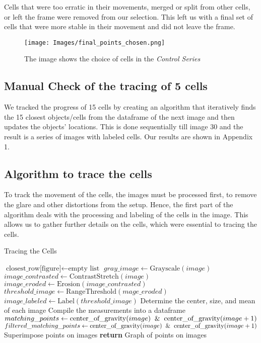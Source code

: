 \documentclass{article}
\begin{document}
Cells that were too erratic in their movements, merged or split from other cells, or left the frame were removed from our selection. This left us with a final set of cells that were more stable in their movement and did not leave the frame.

\begin{figure}[h!]
\centering
\texttt{[image: Images/final\_points\_chosen.png]}
\caption{\label{fig:ChoiceofCells-ControlSeries}The image shows the choice of cells in the \emph{Control Series}}
\end{figure}


\subsection*{Manual Check of the tracing of 5 cells}

We tracked the progress of 15 cells by creating an algorithm that iteratively finds the 15 closest objects/cells from the dataframe of the next image and then updates the objects' locations. This is done sequentially till image 30 and the result is a series of images with labeled cells. Our results are shown in Appendix 1. 

\subsection*{Algorithm to trace the cells}
To track the movement of the cells, the images must be processed first, to remove the glare and other distortions from the setup. Hence, the first part of the algorithm deals with the processing and labeling of the cells in the image. This allows us to gather further details on the cells, which were essential to tracing the cells. 

\begin{algorithm}[h!]
\caption{Tracing the Cells}\label{cell-trace}
\begin{algorithmic}[1]
    \State $\text{closest\_row[figure]} \gets \text{empty list}$
        \State $gray\_image \gets \text{Grayscale}(image)$
        \State $image\_contrasted \gets \text{ContrastStretch}(image)$
        \State $image\_eroded \gets \text{Erosion}(image\_contrasted)$
        \State $threshold\_image \gets \text{RangeThreshold}(mage\_eroded)$
        \State $image\_labeled \gets \text{Label}(threshold\_image)$
        \State Determine the center, size, and mean of each image
    \EndFor
    \State Compile the measurements into a dataframe
        \State $matching\_points \gets \text{center\_of\_gravity}(image) \And \text{center\_of\_gravity}(image+1)$
        \State $filtered\_matching\_points \gets \text{center\_of\_gravity}(image) \And \text{center\_of\_gravity}(image+1)$
        \State Superimpose points on images
    \EndFor
    \State \textbf{return} Graph of points on images
\EndProcedure
\end{algorithmic}
\end{algorithm}
\end{document}
